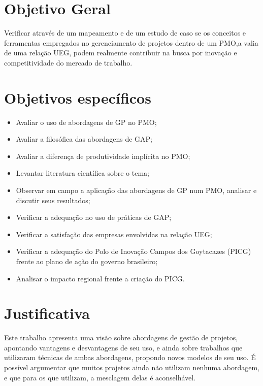\section{Objetivo Geral}

Verificar através de um mapeamento e de um estudo de caso se os conceitos e ferramentas empregados no gerenciamento de projetos dentro de um PMO,a valia de uma relação UEG, podem realmente contribuir na busca por inovação e competitividade do mercado de trabalho.


\section{Objetivos específicos}

\begin{itemize}
  \item{Avaliar o uso de abordagens de GP no PMO;}
  \item{Avaliar a filosófica das abordagens de GAP;}
  \item{Avaliar a diferença de produtividade implícita no PMO;}
  \item{Levantar literatura científica sobre o tema;}
  \item{Observar em campo a aplicação das abordagens de GP num PMO, analisar e discutir seus resultados;}
  \item{Verificar a adequação no uso de práticas de GAP;}
  \item{Verificar a satisfação das empresas envolvidas na relação UEG;}
  \item{Verificar a adequação do Polo de Inovação Campos dos Goytacazes (PICG) frente ao plano de ação do governo brasileiro;}
  \item{Analisar o impacto regional frente a criação do PICG.}
\end{itemize}

\section{Justificativa}

Este trabalho apresenta uma visão sobre abordagens de gestão de projetos, apontando vantagens e desvantagens de seu uso, e ainda sobre trabalhos que utilizaram técnicas de ambas abordagens, propondo novos modelos de seu uso. É possível argumentar que muitos projetos ainda não utilizam nenhuma abordagem, e que para os que utilizam, a mesclagem delas é aconselhável.

